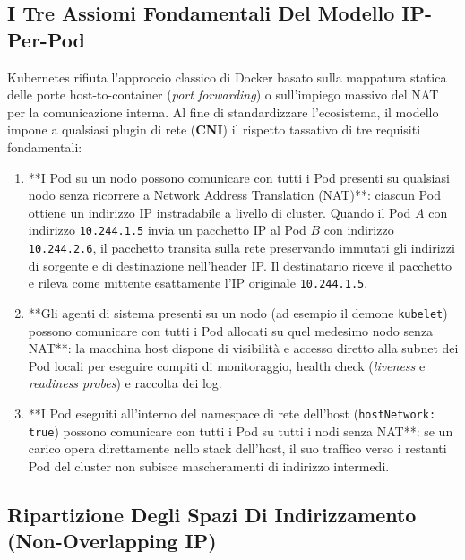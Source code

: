 \documentclass[11pt, a4paper]{article}
\begin{document}
\subsection{I Tre Assiomi Fondamentali Del Modello IP-Per-Pod}

Kubernetes rifiuta l'approccio classico di Docker basato sulla mappatura statica delle porte host-to-container (\emph{port forwarding}) o sull'impiego massivo del NAT per la comunicazione interna. Al fine di standardizzare l'ecosistema, il modello impone a qualsiasi plugin di rete (\textbf{CNI}) il rispetto tassativo di tre requisiti fondamentali:

\begin{enumerate}
    \item **I Pod su un nodo possono comunicare con tutti i Pod presenti su qualsiasi nodo senza ricorrere a Network Address Translation (NAT)**: ciascun Pod ottiene un indirizzo IP instradabile a livello di cluster. Quando il Pod $A$ con indirizzo \texttt{10.244.1.5} invia un pacchetto IP al Pod $B$ con indirizzo \texttt{10.244.2.6}, il pacchetto transita sulla rete preservando immutati gli indirizzi di sorgente e di destinazione nell'header IP. Il destinatario riceve il pacchetto e rileva come mittente esattamente l'IP originale \texttt{10.244.1.5}.
    \item **Gli agenti di sistema presenti su un nodo (ad esempio il demone \texttt{kubelet}) possono comunicare con tutti i Pod allocati su quel medesimo nodo senza NAT**: la macchina host dispone di visibilità e accesso diretto alla subnet dei Pod locali per eseguire compiti di monitoraggio, health check (\emph{liveness} e \emph{readiness probes}) e raccolta dei log.
    \item **I Pod eseguiti all'interno del namespace di rete dell'host (\texttt{hostNetwork: true}) possono comunicare con tutti i Pod su tutti i nodi senza NAT**: se un carico opera direttamente nello stack dell'host, il suo traffico verso i restanti Pod del cluster non subisce mascheramenti di indirizzo intermedi.
\end{enumerate}

\subsection{Ripartizione Degli Spazi Di Indirizzamento (Non-Overlapping IP)}
\end{document}
